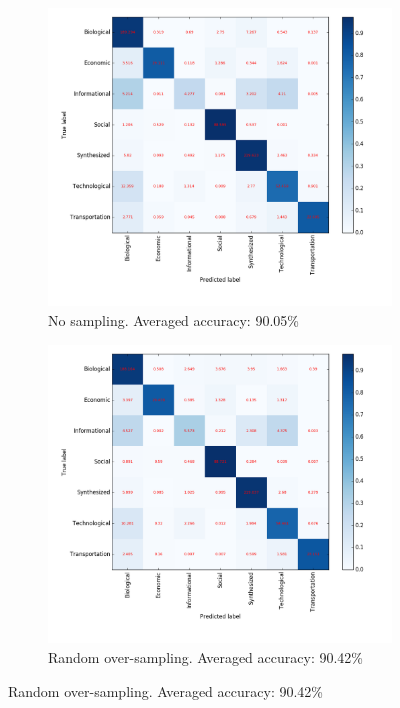 \documentclass{article}
\begin{document}
\begin{figure}[H]
\begin{subfigure}{0.48\textwidth}
\includegraphics[width=\linewidth]{figs/similarity/Domain/None/confusion.png}
\caption{No sampling. Averaged accuracy: 90.05\%} \label{no_confusion}
\end{subfigure}\hspace*{\fill}
\begin{subfigure}{0.48\textwidth}
\includegraphics[width=\linewidth]{figs/similarity/Domain/RandomOver/confusion.png}
\caption{Random over-sampling. Averaged accuracy: 90.42\%} \label{random_over_confusion}
\end{subfigure}


\end{figure}
\end{document}
